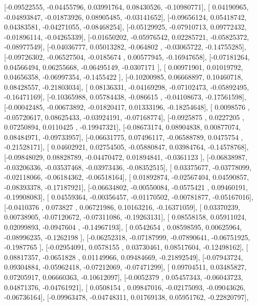 \documentclass{article}
\begin{document}
       [-0.09522555, -0.04455796,  0.03991764,  0.08430526, -0.10980771],
       [ 0.04190965, -0.04893847, -0.01873926,  0.08905485, -0.03141652],
       [-0.09656124,  0.05418742,  0.04383581, -0.04271055, -0.08468254],
       [-0.05129925, -0.07910713,  0.09772432, -0.01896114, -0.04265339],
       [-0.01650202, -0.05976542,  0.02285721, -0.05825372, -0.08977549],
       [-0.04036777,  0.05013282, -0.064802  , -0.03065722, -0.14755285],
       [-0.09726302, -0.06527504, -0.0185674 ,  0.00577945, -0.16947658],
       [-0.07181264,  0.04566494,  0.06255668, -0.06495149, -0.0307171 ],
       [ 0.00971901,  0.01019792,  0.04656358, -0.06997354, -0.1455422 ],
       [-0.10200985,  0.06668897,  0.10460718,  0.08428557, -0.21803034],
       [ 0.08136331, -0.04169298, -0.07102473, -0.05892495, -0.16471169],
       [-0.10365988,  0.05784438, -0.086615  , -0.04108673, -0.17561598],
       [-0.00042485, -0.00673892, -0.01820417,  0.01333196, -0.18254648],
       [ 0.0098576 , -0.05720617,  0.08625433, -0.03924191, -0.07168774],
       [-0.0925875 ,  0.0227205 ,  0.07250894,  0.0110425 , -0.19947321],
       [-0.08673174,  0.08904838,  0.00877074,  0.08484971, -0.09733957],
       [-0.06631775,  0.07496117, -0.06588789,  0.0475754 , -0.21528171],
       [ 0.04602921,  0.02754505, -0.05880847,  0.03984764, -0.14578768],
       [-0.09848029,  0.08828789, -0.04470472,  0.01894841, -0.0361123 ],
       [-0.06838987, -0.03206336, -0.03537468, -0.03973436, -0.08352515],
       [ 0.03375677, -0.03778099, -0.02118066, -0.06184362, -0.06518164],
       [ 0.01892874, -0.02567404,  0.04590857, -0.08393378, -0.17187921],
       [-0.06634802, -0.00550084, -0.0575421 ,  0.09460191, -0.19908083],
       [ 0.04559364, -0.00356457, -0.01170502, -0.00781877, -0.05167016],
       [-0.0410376 ,  0.073827  ,  0.06721986,  0.10163216, -0.16371059],
       [ 0.03370239,  0.00738905, -0.07120672, -0.07311086, -0.19263131],
       [ 0.08558158,  0.05911024,  0.02099893, -0.0947604 , -0.14967193],
       [ 0.0542654 ,  0.08598595,  0.00625964, -0.08996235, -0.1262198 ],
       [-0.06252318, -0.07187999, -0.07890641, -0.06751925, -0.1987765 ],
       [-0.02954091,  0.0578155 ,  0.03730461,  0.08517604, -0.12498162],
       [ 0.08817357, -0.0651828 ,  0.01149966,  0.09484669, -0.21892549],
       [-0.07943724,  0.09304884, -0.05962418, -0.07212069, -0.07471299],
       [ 0.09704511,  0.03485827,  0.07205917,  0.06660363, -0.10612097],
       [-0.0052379 ,  0.05457343, -0.06043723,  0.04871376, -0.04761921],
       [ 0.0508154 ,  0.09847016, -0.02175093, -0.09043626, -0.06736164],
       [-0.09963478, -0.04748311,  0.01769138,  0.05951762, -0.22820797],
\end{document}
